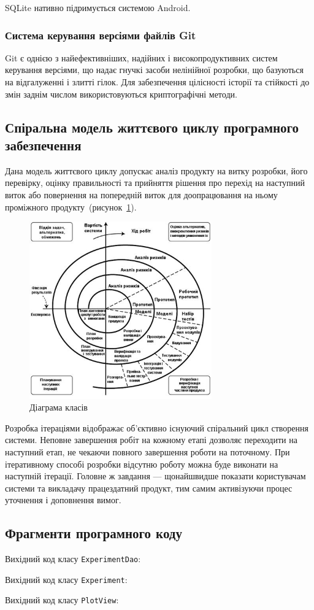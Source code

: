 SQLite нативно підримується системою Android.

\subsubsection{Система керування версіями файлів Git}
Git є однією з найефективніших, надійних і високопродуктивних систем керування версіями, що надає гнучкі засоби нелінійної розробки, що базуються на відгалуженні і злитті гілок. 
Для забезпечення цілісності історії та стійкості до змін заднім числом використовуються криптографічні методи.

\subsection{Спіральна модель життєвого циклу програмного забезпечення}
Дана модель життєвого циклу допускає аналіз продукту на витку розробки, його перевірку, оцінку правильності та прийняття рішення про перехід на наступний виток або повернення на попередній виток для доопрацювання на ньому проміжного продукту~(рисунок~\ref{fig:spiral_model}).

\begin{figure}[H]
  \centering
    \includegraphics[width=0.7\textwidth]{spiral_model}
  \caption{Діаграма класів}
  \label{fig:spiral_model}
\end{figure}

Розробка ітераціями відображає об'єктивно існуючий спіральний цикл створення системи. 
Неповне завершення робіт на кожному етапі дозволяє переходити на наступний етап, не чекаючи повного завершення роботи на поточному. 
При ітеративному способі розробки відсутню роботу можна буде виконати на наступній ітерації. 
Головне ж завдання --- щонайшвидше показати користувачам системи та викладачу працездатний продукт, тим самим активізуючи процес уточнення і доповнення вимог.

\subsection{Фрагменти програмного коду}
Вихідний код класу \texttt{ExperimentDao}:


Вихідний код класу \texttt{Experiment}:


Вихідний код класу \texttt{PlotView}:



